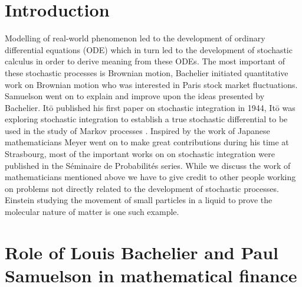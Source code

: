 \documentclass{article}
\begin{document}
\section{Introduction
}
Modelling of real-world phenomenon led to the development of ordinary differential equations (ODE) which in turn led to the development of stochastic calculus in order to derive meaning from these ODEs.  The most important of these stochastic processes is Brownian motion, Bachelier\cite{Bach1} initiated quantitative work on Brownian motion who was interested in Paris stock market fluctuations.  Samuelson\cite{Sam1} \cite{Sam2} went on to explain and improve upon the ideas presented by Bachelier.  It\={o} published his  first paper \cite{Ito1} on stochastic integration in 1944, It\={o} was exploring stochastic integration to establish a true stochastic differential to be used in the study of Markov processes .  Inspired by the work of Japanese mathematicians Meyer \cite{Mey1} \cite{Mey2} \cite{Mey3} \cite{Mey4} went on to make great contributions during his time at Strasbourg, most of the important works on on stochastic integration were published in the S\'{e}minaire de Probabilit\'{e}s series.  While we discuss the work of mathematicians mentioned above we have to give credit to other people working on problems not directly related to the development of stochastic processes. Einstein \cite{Ein1} studying the movement of small particles in a liquid to prove the molecular nature of matter is one such example.

\section{Role of Louis Bachelier and Paul Samuelson in mathematical finance 
}
\end{document}
